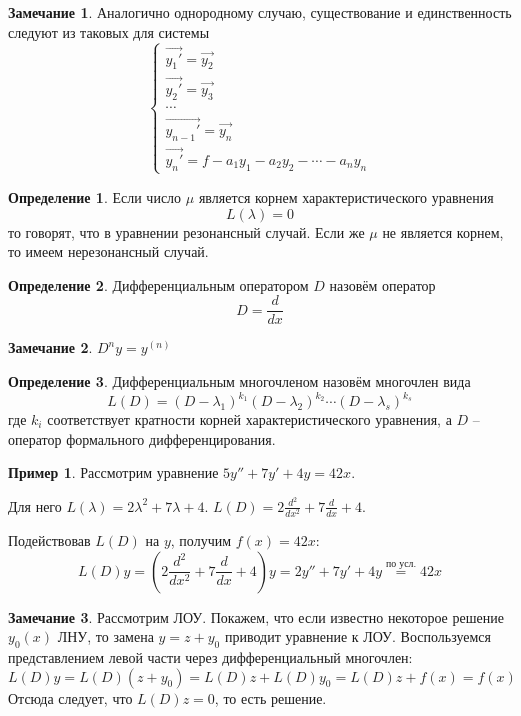 \documentclass[a4paper,12pt]{article}
\theoremstyle{plain}
\theoremstyle{definition}
\newtheorem{definition}{Определение}[section]
\newtheorem*{note}{Замечание}
\newtheorem*{example}{Пример}
\theoremstyle{remark}
\begin{document}
\begin{note}
	Аналогично однородному случаю, существование и единственность следуют из таковых для системы
	\[\begin{cases}
			\vec{y_1'} = \vec{y_2}     \\
			\vec{y_2'} = \vec{y_3}     \\
			\cdots                     \\
			\vec{y_{n-1}'} = \vec{y_n} \\
			\vec{y_n'} = f - a_1y_1 - a_2y_2 - \cdots - a_ny_n
		\end{cases}\]
\end{note}

\begin{definition}
	Если число $\mu$ является корнем характеристического уравнения
	\[L(\lambda) = 0\]
	то говорят, что в уравнении резонансный случай. Если же $\mu$ не является корнем, то имеем нерезонансный случай.
\end{definition}

\begin{definition}
	Дифференциальным оператором $D$ назовём оператор 
	\[D = \frac{d}{dx}\]
\end{definition}

\begin{note}
	$D^ny = y^{(n)}$
\end{note}

\begin{definition}
	Дифференциальным многочленом назовём многочлен вида
	\[L(D) = (D - \lambda_1)^{k_1}(D - \lambda_2)^{k_2}\cdots(D - \lambda_s)^{k_s}\]
	где $k_i$ соответствует кратности корней характеристического уравнения, а $D$ -- оператор формального дифференцирования.
\end{definition}

\begin{example}
	Рассмотрим уравнение $5y'' + 7y' + 4y = 42x$. 
	
	Для него $L(\lambda) = 2\lambda^2 + 7\lambda + 4$. $L(D) = 2\frac{d^2}{dx^2} + 7\frac{d}{dx} + 4$.

	Подействовав $L(D)$ на $y$, получим $f(x) = 42x$:
	\[L(D)y = (2\frac{d^2}{dx^2} + 7\frac{d}{dx} + 4)y = 2y'' + 7y' + 4y \overset{\text{по усл.}}{=} 42x\]
\end{example}

\begin{note}
	Рассмотрим ЛОУ. Покажем, что если известно некоторое решение $y_0(x)$ ЛНУ, то замена $y = z + y_0$ приводит уравнение к ЛОУ. Воспользуемся представлением левой части через дифференциальный многочлен:
	\[L(D)y = L(D)(z + y_0) = L(D)z + L(D)y_0 = L(D)z + f(x) = f(x)\]
	Отсюда следует, что $L(D)z = 0$, то есть решение.
\end{note}
\end{document}
